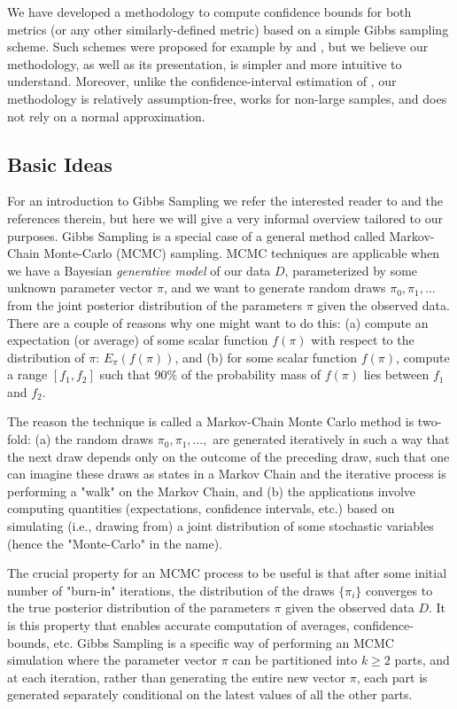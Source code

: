 \documentclass[11pt,a4paper]{article}
\theoremstyle{definition}
\theoremstyle{remark}
\theoremstyle{definition}
\theoremstyle{definition}
\theoremstyle{definition}
\theoremstyle{definition}
\theoremstyle{definition}
\theoremstyle{definition}
\begin{document}
We have developed a methodology to compute confidence bounds for both metrics (or any other similarly-defined metric) based on a simple Gibbs sampling scheme. Such schemes were proposed for example by \cite{Chickering1996} and \cite{Barajas2012}, but we believe our methodology, as well as its presentation, is simpler and more intuitive to understand. Moreover, unlike the confidence-interval estimation of \cite{Imbens1997a}, our methodology is relatively assumption-free, works for non-large samples, and does not rely on a normal approximation.

\subsection{Basic Ideas}

For an introduction to Gibbs Sampling we refer the interested reader to \cite{resnik2010gibbs} and the references therein, but here we will give a very informal overview tailored to our purposes. Gibbs Sampling is a special case of a general  method called Markov-Chain Monte-Carlo (MCMC) sampling. MCMC techniques are applicable when we have a Bayesian \textit{generative model} of our data $D$, parameterized by some unknown parameter vector $\pi$, and we want to generate random draws $\pi_0, \pi_1, \ldots$ from the joint posterior distribution of the parameters $\pi$ given the observed data. There are a couple of reasons why one might want to do this: (a) compute an expectation (or average) of some scalar function $f(\pi)$ with respect to the distribution of $\pi$: $E_\pi(f(\pi))$, and (b) for some scalar function $f(\pi)$, compute a range $[f_1, f_2]$ such that 90\% of the probability mass of $f(\pi)$ lies between $f_1$ and $f_2$.

The reason the technique is called a Markov-Chain Monte Carlo method is two-fold: (a) the random draws $\pi_0, \pi_1, \ldots,$ are generated iteratively in such a way that the next draw depends only on the outcome of the preceding draw, such that one can imagine these draws as states in a Markov Chain and the iterative process is performing a "walk" on the Markov Chain, and (b) the applications involve computing quantities (expectations, confidence intervals, etc.) based on simulating (i.e., drawing from) a joint distribution of some stochastic variables (hence the "Monte-Carlo" in the name). 

The crucial property for an MCMC process to be useful is that after some initial number of "burn-in" iterations, the distribution of the draws $\{\pi_i\}$ converges to the true posterior distribution of the parameters $\pi$ given the observed data $D$. It is this property that enables accurate computation of averages, confidence-bounds, etc. Gibbs Sampling is a specific way of performing an MCMC simulation where the parameter vector $\pi$ can be partitioned into $k \geq 2$ parts, and at each iteration, rather than generating the entire new vector $\pi$, each part is generated separately conditional on the latest values of all the other parts.
\end{document}
